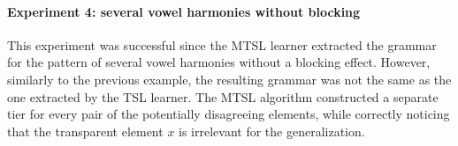 \begin{table}[h!]
\centering
{}
\caption{MTSL learning of a single harmony with blockers; abstract representation.}
\end{table}


\paragraph{Experiment 4: several vowel harmonies without blocking}

This experiment was successful since the MTSL learner extracted the grammar for the pattern of several vowel harmonies without a blocking effect.
However, similarly to the previous example, the resulting grammar was not the same as the one extracted by the TSL learner.
The MTSL algorithm constructed a separate tier for every pair of the potentially disagreeing elements, while correctly noticing that the transparent element $x$ is irrelevant for the generalization.

